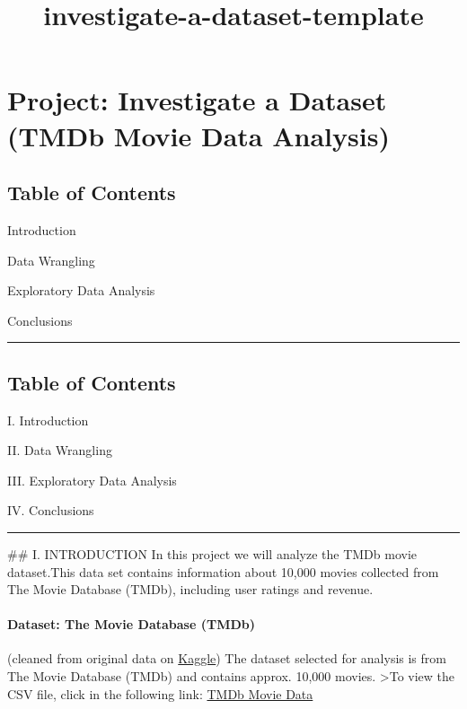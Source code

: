 \documentclass[11pt]{article}
\title{investigate-a-dataset-template}
\begin{document}
    
    
    \maketitle
    
    

    
    \section{Project: Investigate a Dataset (TMDb Movie Data
Analysis)}\label{project-investigate-a-dataset-tmdb-movie-data-analysis}

\subsection{Table of Contents}\label{table-of-contents}

Introduction

Data Wrangling

Exploratory Data Analysis

Conclusions

    \begin{center}\rule{0.5\linewidth}{\linethickness}\end{center}

\subsection{Table of Contents}\label{table-of-contents}

I. Introduction

II. Data Wrangling

III. Exploratory Data Analysis

IV. Conclusions

\begin{center}\rule{0.5\linewidth}{\linethickness}\end{center}

 \#\# I. INTRODUCTION In this project we will analyze the TMDb movie
dataset.This data set contains information about 10,000 movies collected
from The Movie Database (TMDb), including user ratings and revenue.

\paragraph{Dataset: The Movie Database
(TMDb)}\label{dataset-the-movie-database-tmdb}

(cleaned from original data on
\href{https://www.google.com/url?q=https://www.kaggle.com/tmdb/tmdb-movie-metadata\&sa=D\&ust=1532959635693000}{Kaggle})
The dataset selected for analysis is from The Movie Database (TMDb) and
contains approx. 10,000 movies. \textgreater{}To view the CSV file,
click in the following link:
\href{https://www.google.com/url?q=https://d17h27t6h515a5.cloudfront.net/topher/2017/October/59dd1c4c_tmdb-movies/tmdb-movies.csv\&sa=D\&ust=1532959635693000}{TMDb
Movie Data}
\end{document}
